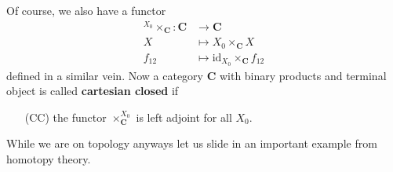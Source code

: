 Of course, we also have a functor
\begin{align*}
  {}^{X_{0}}\times_{\mathbf{C}}
  \colon
  \mathbf{C}
  &\rightarrow
  \mathbf{C}
  \\
  X
  &\mapsto
  X_{0}
  \times_{\mathbf{C}}
  X
  \\
  f_{12}
  &\mapsto
  \mathrm{id}_{X_{0}}
  \times_{\mathbf{C}}
  f_{12}
\end{align*}
defined in a similar vein. Now a category $\mathbf{C}$ with binary products and terminal object is called \textbf{cartesian closed} if
\begin{enumerate}
\item[(CC)]
the functor $\times_{\mathbf{C}}^{X_{0}}$ is left adjoint for all $X_{0}$.
\end{enumerate}
While we are on topology anyways let us slide in an important example from homotopy theory.
\\
